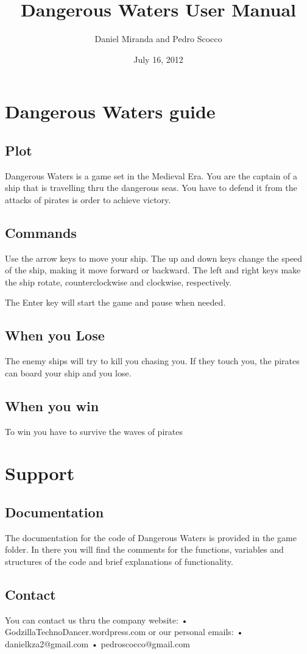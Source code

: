 \documentclass[a4paper,10pt]{article}
\title{Dangerous Waters User Manual}
\author{Daniel Miranda and Pedro Scocco}
\date{July 16, 2012}
\begin{document}
\maketitle
\tableofcontents
\newpage

\section{Dangerous Waters guide}

\subsection{Plot}
Dangerous Waters is a game set in the Medieval Era. You are the captain of a ship that is travelling thru the dangerous seas. You have to defend it from the attacks of pirates is order to achieve victory.

\subsection{Commands}
Use the arrow keys to move your ship. The up and down keys change the speed of the ship, making it move forward or backward. The left and right keys make the ship rotate, counterclockwise and clockwise, respectively.

The Enter key will start the game and pause when needed.

\subsection{When you Lose}
The enemy ships will try to kill you chasing you. If they touch you, the pirates can board your ship and you lose.

\subsection{When you win}
To win you have to survive the waves of pirates 

\section{Support}

\subsection{Documentation}
The documentation for the code of Dangerous Waters is provided in the game folder. In there you will find the comments for the functions, variables and structures of the code and brief explanations of functionality.

\subsection{Contact}
You can contact us thru the company website: 
\newline
• GodzillaTechnoDancer.wordpress.com 
\newline
\newline
or our personal emails:
\newline
• danielkza2@gmail.com
\newline
• pedroscocco@gmail.com
\end{document}
